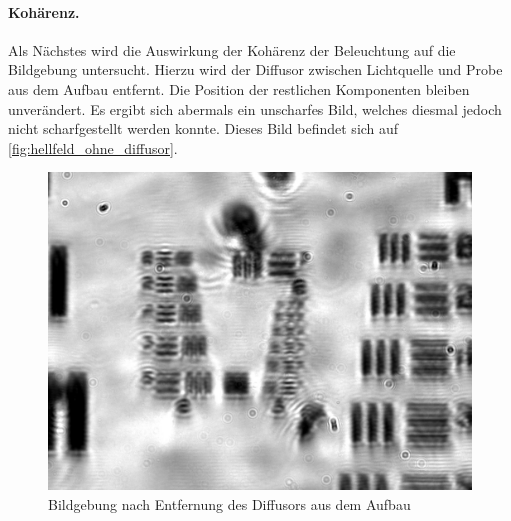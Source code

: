 \documentclass[english, ngerman]{scrartcl}
\begin{document}
\paragraph{Kohärenz.}
Als Nächstes wird die Auswirkung der Kohärenz der Beleuchtung auf die Bildgebung untersucht. Hierzu wird der Diffusor zwischen Lichtquelle und Probe aus dem Aufbau entfernt. Die Position der restlichen Komponenten bleiben unverändert. Es ergibt sich abermals ein unscharfes Bild, welches diesmal jedoch nicht scharfgestellt werden konnte. Dieses Bild befindet sich auf \autoref{fig:hellfeld_ohne_diffusor}.
%
\begin{figure}[H]
    \centering
    \begin{samepage}
        \includegraphics[width=0.475\linewidth]{fig/Versuch3/hellfeld_3.2_ohne_diffusor.jpg}
        \caption[Hellfeld Kohärenz]{Bildgebung nach Entfernung des Diffusors aus dem Aufbau}
        \label{fig:hellfeld_ohne_diffusor}
    \end{samepage}
\end{figure}
\end{document}
